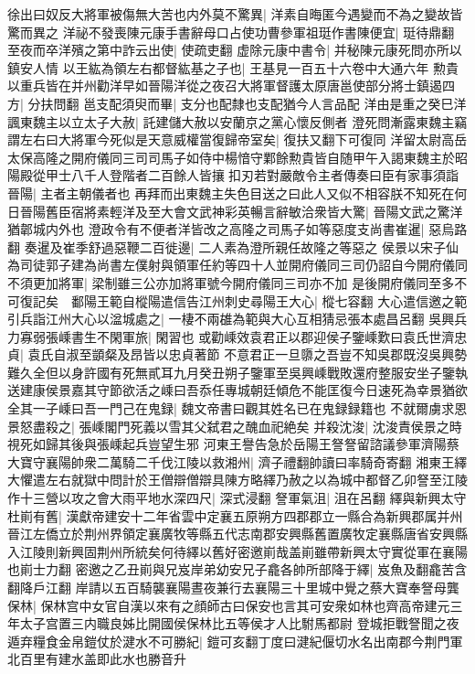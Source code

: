 徐出曰奴反大將軍被傷無大苦也内外莫不驚異|{
	洋素自晦匿今遇變而不為之變故皆驚而異之}
洋祕不發喪陳元康手書辭母口占使功曹參軍祖珽作書陳便宜|{
	珽待鼎翻}
至夜而卒洋殯之第中詐云出使|{
	使疏吏翻}
虚除元康中書令|{
	并秘陳元康死問亦所以鎮安人情}
以王紘為領左右都督紘基之子也|{
	王基見一百五十六卷中大通六年}
勲貴以重兵皆在并州勸洋早如晉陽洋從之夜召大將軍督護太原唐邕使部分將士鎮遏四方|{
	分扶問翻}
邕支配須臾而畢|{
	支分也配隸也支配猶今人言品配}
洋由是重之癸巳洋諷東魏主以立太子大赦|{
	託建儲大赦以安蘭京之黨心懷反側者}
澄死問漸露東魏主竊謂左右曰大將軍今死似是天意威權當復歸帝室矣|{
	復扶又翻下可復同}
洋留太尉高岳太保高隆之開府儀同三司司馬子如侍中楊愔守鄴餘勲貴皆自随甲午入謁東魏主於昭陽殿從甲士八千人登階者二百餘人皆攘扣刃若對嚴敵令主者傳奏曰臣有家事須詣晉陽|{
	主者主朝儀者也}
再拜而出東魏主失色目送之曰此人又似不相容朕不知死在何日晉陽舊臣宿將素輕洋及至大會文武神彩英暢言辭敏洽衆皆大驚|{
	晉陽文武之驚洋猶郼城内外也}
澄政令有不便者洋皆改之高隆之司馬子如等惡度支尚書崔暹|{
	惡烏路翻}
奏暹及崔季舒過惡鞭二百徙邊|{
	二人素為澄所親任故隆之等惡之}
侯景以宋子仙為司徒郭子建為尚書左僕射與領軍任約等四十人並開府儀同三司仍詔自今開府儀同不須更加將軍|{
	梁制雖三公亦加將軍號今開府儀同三司亦不加}
是後開府儀同至多不可復記矣　鄱陽王範自樅陽遣信告江州刺史尋陽王大心|{
	樅七容翻}
大心遣信邀之範引兵詣江州大心以湓城處之|{
	一棲不兩䧺為範與大心互相猜忌張本處昌呂翻}
吳興兵力寡弱張嵊書生不閑軍旅|{
	閑習也}
或勸嵊效袁君正以郡迎侯子鑒嵊歎曰袁氏世濟忠貞|{
	袁氏自淑至顗粲及昂皆以忠貞著節}
不意君正一旦隳之吾豈不知吳郡既沒吳興勢難久全但以身許國有死無貳耳九月癸丑朔子鑒軍至吳興嵊戰敗還府整服安坐子鑒執送建康侯景嘉其守節欲活之嵊曰吾忝任專城朝廷傾危不能匡復今日速死為幸景猶欲全其一子嵊曰吾一門己在鬼録|{
	魏文帝書曰觀其姓名已在鬼録録籍也}
不就爾虜求恩景怒盡殺之|{
	張嵊閣門死義以雪其父弑君之醜血祀絶矣}
并殺沈浚|{
	沈浚責侯景之時視死如歸其後與張嵊起兵豈望生邪}
河東王譽告急於岳陽王詧詧留諮議參軍濟陽蔡大寶守襄陽帥衆二萬騎二千伐江陵以救湘州|{
	濟子禮翻帥讀曰率騎奇寄翻}
湘東王繹大懼遣左右就獄中問計於王僧辯僧辯具陳方略繹乃赦之以為城中都督乙卯詧至江陵作十三營以攻之會大雨平地水深四尺|{
	深式浸翻}
詧軍氣沮|{
	沮在呂翻}
繹與新興太守杜崱有舊|{
	漢獻帝建安十二年省雲中定襄五原朔方四郡郡立一縣合為新興郡属并州晉江左僑立於荆州界領定襄廣牧等縣五代志南郡安興縣舊置廣牧定襄縣唐省安興縣入江陵則新興固荆州所統矣何待繹以舊好密邀崱哉盖崱雖帶新興太守實從軍在襄陽也崱士力翻}
密邀之乙丑崱與兄岌岸弟幼安兄子龕各帥所部降于繹|{
	岌魚及翻龕苦含翻降戶江翻}
岸請以五百騎襲襄陽晝夜兼行去襄陽三十里城中覺之蔡大寶奉詧母龔保林|{
	保林宫中女官自漢以來有之顔師古曰保安也言其可安衆如林也齊高帝建元三年太子宫置三内職良姊比開國侯保林比五等侯才人比駙馬都尉}
登城拒戰詧聞之夜遁弃糧食金帛鎧仗於湕水不可勝紀|{
	鎧可亥翻丁度曰湕紀偃切水名出南郡今荆門軍北百里有建水盖即此水也勝音升}
